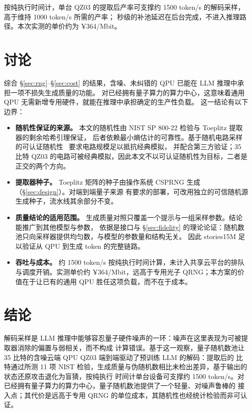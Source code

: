 \documentclass[11pt]{article}
\begin{document}
按纯执行时间计，单台 QZ03 的提取后产率可支撑约 1500 token/s 的解码采样，高于维持 1000 token/s 所需的产率；%
秒级的补池延迟在后台完成，不进入推理路径。本次实测的单价约为 ¥364/Mbit。

\section{讨论}
\label{sec:disc}
综合 \S\ref{sec:rng}--\S\ref{sec:cost} 的结果，含噪、未纠错的 QPU 已能在 LLM 推理中承担一项不损失生成质量的功能。%
对已经拥有量子算力的算力中心，这意味着通用 QPU 无需新增专用硬件，就能在推理中承担确定的生产性负载。%
这一结论有以下边界：
\begin{itemize}
  \item \textbf{随机性保证的来源。} 本文的随机性由 NIST SP 800-22 检验与 Toeplitz 提取器的剩余哈希引理保证，%
        后者依赖最小熵估计的可靠性。基于随机电路采样的可认证随机性~\cite{jpmc} 要求电路规模足以抵抗经典模拟，%
        并配合第三方验证；35 比特 QZ03 的电路可被经典模拟，因此本文不以可认证随机性为目标，二者是正交的两个方向。
  \item \textbf{提取器种子。} Toeplitz 矩阵的种子由操作系统 CSPRNG 生成（\S\ref{sec:design}）。对端到端量子来源%
        有要求的部署，可改用独立的可信随机源生成种子，流水线其余部分不变。
  \item \textbf{质量结论的适用范围。} 生成质量对照只覆盖一个提示与一组采样参数。结论能推广到其他模型与参数，%
        依据是接口与 \S\ref{sec:fidelity} 的理论论证：随机数池只向采样器提供均匀数，与模型的参数量和结构无关。%
        因此 stories15M 足以验证从 QPU 到生成 token 的完整链路。
  \item \textbf{吞吐与成本。} 约 1500 token/s 按纯执行时间计算，未计入共享云平台的排队与调度开销。实测单价约
        ¥364/Mbit，远高于专用光子 QRNG；本方案的价值在于让已有的通用 QPU 胜任这项负载，而不在于成本。
\end{itemize}

\section{结论}
解码采样是 LLM 推理中能够容忍量子硬件噪声的一环：噪声在这里表现为可被提取器消除的偏置与弱相关，而不构成%
计算错误。基于这一观察，量子随机数池让 35 比特的含噪云端 QPU QZ03 端到端驱动了预训练 LLM 的解码：提取后的%
比特通过所测 11 项 NIST 检验，生成质量与伪随机数相比未检出差异，基于输出的状态还原攻击退化为盲猜，按纯执行%
时间计单台设备可支撑约 1500 token/s。对已经拥有量子算力的算力中心，量子随机数池提供了一个轻量、对噪声鲁棒的%
接入点；其代价是远高于专用 QRNG 的单位成本，其随机性也经统计检验而非可认证。
\end{document}
